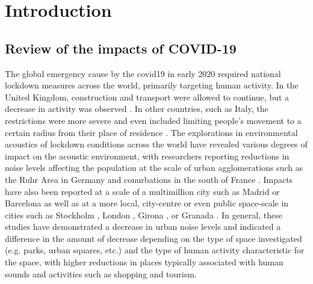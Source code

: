  \section{Introduction}
\label{sec:intro}

\subsection{Review of the impacts of COVID-19}
 \label{sec:covidReview}
 The global emergency cause by the \gls{covid19} in early 2020 required national lockdown measures across the world, primarily targeting human activity. In the United Kingdom, construction and transport were allowed to continue, but a decrease in activity was observed \citep{Hadjidemetriou2020impact}. In other countries, such as Italy, the restrictions were more severe and even included limiting people's movement to a certain radius from their place of residence \citep{Ren2020Pandemic}. The explorations in environmental acoustics of lockdown conditions across the world have revealed various degrees of impact on the acoustic environment, with researchers reporting reductions in noise levels affecting the population at the scale of urban agglomerations such as the Ruhr Area in Germany \citep{Hornberg2021Impact} and conurbations in the south of France \citep{Munoz2020Lockdown}. Impacts have also been reported at a scale of a multimillion city such as Madrid \citep{Asensio2020Changes} or Barcelona \citep{BonetSola2021Soundscape} as well as at a more local, city-centre or even public space-scale in cities such as Stockholm \citep{Rumpler2021Noise}, London \citep{Aletta2020Assessing}, Girona \citep{AlsinaPages2021Changes}, or Granada \citep{VidaManzano2021sound}. In general, these studies have demonstrated a decrease in urban noise levels and indicated a difference in the amount of decrease depending on the type of space investigated (e.g. parks, urban squares, etc.) and the type of human activity characteristic for the space, with higher reductions in places typically associated with human sounds and activities such as shopping and tourism.

